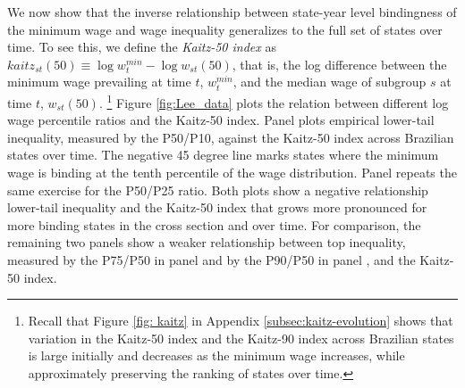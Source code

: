 We now show that the inverse relationship between state-year level bindingness of the minimum wage and wage inequality generalizes to the full set of states over time. To see this, we define the \emph{Kaitz-50 index} as $kaitz_{st}(50) \equiv \log w_{t}^{min} - \log w_{st}(50)$, that is, the log difference between the minimum wage prevailing at time $t$, $w_{t}^{min}$, and the median wage of subgroup $s$ at time $t$, $w_{st}(50)$.%
%
\footnote{Recall that Figure \ref{fig: kaitz} in Appendix \ref{subsec:kaitz-evolution} shows that variation in the Kaitz-50 index and the Kaitz-90 index across Brazilian states is large initially and decreases as the minimum wage increases, while approximately preserving the ranking of states over time.} %
%
Figure \ref{fig:Lee_data} plots the relation between different
log wage percentile ratios and the Kaitz-50 index. Panel  plots empirical lower-tail
inequality, measured by the P50/P10, against the Kaitz-50 index across
Brazilian states over time. The negative 45 degree line marks states
where the minimum wage is binding at the tenth percentile of the wage distribution.
Panel  repeats the same exercise
for the P50/P25 ratio. Both plots show a negative relationship lower-tail inequality and the Kaitz-50 index that grows more pronounced for more binding states in the cross section and over time. For comparison, the remaining two panels
show a weaker relationship between top inequality, measured by the
P75/P50 in panel  and by the P90/P50 in panel , and the Kaitz-50 index.%


